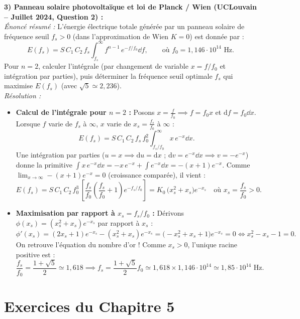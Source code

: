 \begin{exemple}
\medskip
\textbf{3) Panneau solaire photovoltaïque et loi de Planck / Wien (UCLouvain -- Juillet 2024, Question 2) :}\\
\emph{Énoncé résumé :} L'énergie électrique totale générée par un panneau solaire de fréquence seuil $f_s > 0$ (dans l'approximation de Wien $K = 0$) est donnée par :
\[
    E(f_s) = S\,C_1\,C_2\,f_s \int_{f_s}^\infty f^{n-1}\,e^{-f/f_0}\dd f, \qquad \text{où } f_0 = 1,146\cdot 10^{14}\text{ Hz}.
\]
Pour $n = 2$, calculer l'intégrale (par changement de variable $x = f/f_0$ et intégration par parties), puis déterminer la fréquence seuil optimale $f_s$ qui maximise $E(f_s)$ (avec $\sqrt{5} \simeq 2,236$).\\
\emph{Résolution :}
\begin{itemize}
    \item \textbf{Calcul de l'intégrale pour $n = 2$ :} Posons $x = \frac{f}{f_0} \implies f = f_0 x$ et $\mathrm{d}f = f_0\dd x$. Lorsque $f$ varie de $f_s$ à $\infty$, $x$ varie de $x_s = \frac{f_s}{f_0}$ à $\infty$ :
    \[
        E(f_s) = S\,C_1\,C_2\,f_s\,f_0^2 \int_{f_s/f_0}^\infty x\,e^{-x}\dd x.
    \]
    Une intégration par parties ($u = x \implies \mathrm{d}u = \mathrm{d}x$ ; $\mathrm{d}v = e^{-x}\dd x \implies v = -e^{-x}$) donne la primitive $\int x\,e^{-x}\dd x = -x\,e^{-x} + \int e^{-x}\dd x = -(x+1)e^{-x}$. Comme $\lim_{x \to \infty} -(x+1)e^{-x} = 0$ (croissance comparée), il vient :
    \[
        E(f_s) = S\,C_1\,C_2\,f_0^3\,\left[\frac{f_s}{f_0}\left(\frac{f_s}{f_0} + 1\right)e^{-f_s/f_0}\right] = K_0\,\bigl(x_s^2 + x_s\bigr)e^{-x_s} \quad \text{où } x_s = \frac{f_s}{f_0} > 0.
    \]
    \item \textbf{Maximisation par rapport à $x_s = f_s / f_0$ :} Dérivons $\phi(x_s) = (x_s^2 + x_s)e^{-x_s}$ par rapport à $x_s$ :
    \[
        \phi'(x_s) = (2x_s + 1)e^{-x_s} - (x_s^2 + x_s)e^{-x_s} = \bigl(-x_s^2 + x_s + 1\bigr)e^{-x_s} = 0 \iff x_s^2 - x_s - 1 = 0.
    \]
    On retrouve l'équation du nombre d'or ! Comme $x_s > 0$, l'unique racine positive est :
    \[
        \frac{f_s}{f_0} = \frac{1 + \sqrt{5}}{2} \simeq 1,618 \implies \boxed{f_s = \frac{1+\sqrt{5}}{2}f_0 \simeq 1,618 \times 1,146\cdot 10^{14} \simeq 1,85\cdot 10^{14}\text{ Hz}}.
    \]
\end{itemize}
\end{exemple}

\section{Exercices du Chapitre 5}

